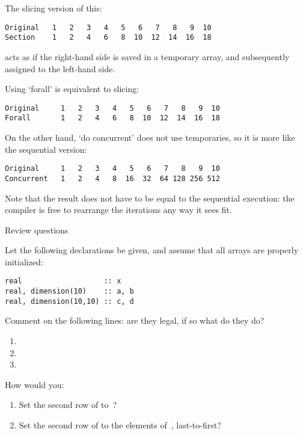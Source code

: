 The slicing version of this:
%
%
\begin{lstlisting}
Original   1   2   3   4   5   6   7   8   9  10
Section    1   2   4   6   8  10  12  14  16  18
\end{lstlisting}
%
acts as if the right-hand side is saved in a temporary array, and
subsequently assigned to the left-hand side.

Using `forall' is equivalent to slicing:
%
%
\begin{lstlisting}
Original     1   2   3   4   5   6   7   8   9  10
Forall       1   2   4   6   8  10  12  14  16  18
\end{lstlisting}

On the other hand, `do concurrent' does not use temporaries, so it is
more like the sequential version:
%
%
\begin{lstlisting}
Original     1   2   3   4   5   6   7   8   9  10
Concurrent   1   2   4   8  16  32  64 128 256 512
\end{lstlisting}
Note that the result does not have to be equal to the sequential
execution: the compiler is free to rearrange the iterations any way it
sees fit.

 {Review questions}

\begin{exercise}
  \label{ex:farray-assign-section}
  Let the following declarations be given, and assume that all arrays
  are properly initialized:
\begin{lstlisting}
real                   :: x
real, dimension(10)    :: a, b
real, dimension(10,10) :: c, d
\end{lstlisting}

Comment on the following lines: are they legal, if so what do they do?
\begin{enumerate}
\item {}
\item {}
\item {}
\end{enumerate}

How would you:
\begin{enumerate}
\item Set the second row of  to~?
\item Set the second row of  to the elements of~, last-to-first?
\end{enumerate}
\end{exercise}
